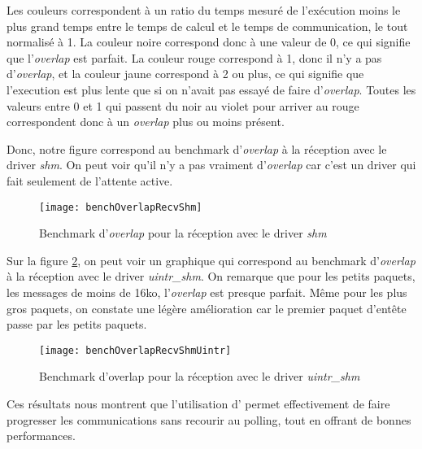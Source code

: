 Les couleurs correspondent à un ratio du temps mesuré de l'exécution moins le plus grand temps entre le temps de calcul et le temps de communication, le tout normalisé à 1.
La couleur noire correspond donc à une valeur de 0, ce qui signifie que l'\emph{overlap} est parfait.
La couleur rouge correspond à 1, donc il n'y a pas d'\emph{overlap},
et la couleur jaune correspond à 2 ou plus, ce qui signifie que l'execution est plus lente que si on n'avait pas essayé de faire d'\emph{overlap}.
Toutes les valeurs entre 0 et 1 qui passent du noir au violet pour arriver au rouge correspondent donc à un \emph{overlap} plus ou moins présent.

Donc, notre figure correspond au benchmark d'\emph{overlap} à la réception avec le driver \emph{shm}.
On peut voir qu'il n'y a pas vraiment d'\emph{overlap} car c'est un driver qui fait seulement de l'attente active.

\begin{figure}[H]
  \texttt{[image: benchOverlapRecvShm]}
  \caption{Benchmark d'\emph{overlap} pour la réception avec le driver \emph{shm}}
  \label{fig:benchOverlapRecvShm}
\end{figure}

Sur la figure \ref{fig:benchOverlapRecvShmUintr}, on peut voir un graphique qui correspond au benchmark d'\emph{overlap} à la réception avec le driver \emph{uintr_shm}.
On remarque que pour les petits paquets, les messages de moins de 16ko, l'\emph{overlap} est presque parfait.
Même pour les plus gros paquets, on constate une légère amélioration car le premier paquet d'entête passe par les petits paquets.
\begin{figure}[H]
  \texttt{[image: benchOverlapRecvShmUintr]}
  \caption{Benchmark d'overlap pour la réception avec le driver \emph{uintr_shm}}
  \label{fig:benchOverlapRecvShmUintr}
\end{figure}


Ces résultats nous montrent que l'utilisation d'\uintr{} permet effectivement de faire progresser les communications sans recourir au polling,
tout en offrant de bonnes performances.

